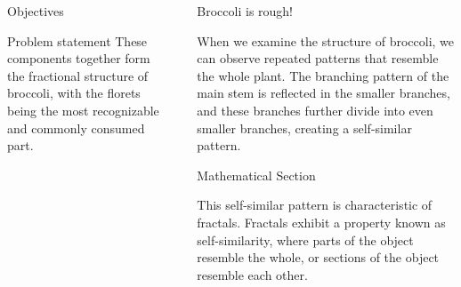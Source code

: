 \documentclass[]{beamer}
\begin{document}
\begin{frame}[t]
\begin{columns}[t]
\begin{column}{\onecolwid}
\begin{alertblock}{Objectives}
\begin{itemize}
    \end{itemize}
    
    \end{alertblock}
    
    \begin{block}{Problem statement}
    These components together form the fractional structure of broccoli, with the florets being the most recognizable and commonly consumed part.
    \end{block}
    
    
    \end{column} %
    
    \begin{column}{\sepwid}\end{column} %
    
    \begin{column}{\onecolwid} %
    
    
    
    \begin{alertblock}{Broccoli is rough!}
    
     When we examine the structure of broccoli, we can observe repeated patterns that resemble the whole plant. The branching pattern of the main stem is reflected in the smaller branches, and these branches further divide into even smaller branches, creating a self-similar pattern.
    
    \end{alertblock} 
    
    
    
    \begin{block}{Mathematical Section}
    
    This self-similar pattern is characteristic of fractals. Fractals exhibit a property known as self-similarity, where parts of the object resemble the whole, or sections of the object resemble each other. 
    

\end{block}
\end{column}
\end{columns}
\end{frame}
\end{document}
